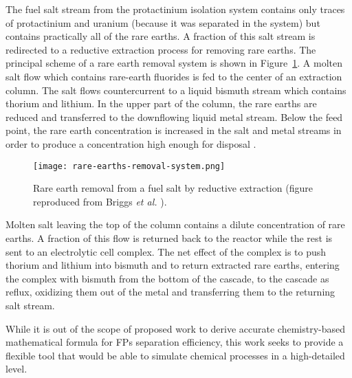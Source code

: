 The fuel salt stream from the protactinium isolation system contains only 
traces of protactinium and uranium (because it was separated in the system) 
but contains practically all of the rare earths. A fraction of this salt 
stream is redirected to a reductive extraction process for removing rare 
earths.  The principal scheme of a rare earth removal system is shown in 
Figure~\ref{fig:rare-earth-removal}. A molten salt flow which contains 
rare-earth fluorides is fed to the center of an extraction column. The salt 
flows countercurrent to a liquid bismuth stream which contains thorium and 
lithium. In the upper part of the column, the rare earths are reduced and 
transferred to the downflowing liquid metal stream. Below the feed point, the 
rare earth concentration is increased in the salt and metal streams in order 
to produce a concentration high enough for disposal 
\cite{briggs_molten-salt_1969}.
\begin{figure}[htbp!]
	\centering
	\texttt{[image: rare-earths-removal-system.png]}
	\caption{Rare earth removal from a fuel salt by reductive extraction 
	(figure reproduced from Briggs \emph{et al.} 
	\cite{briggs_molten-salt_1969}).}
	\label{fig:rare-earth-removal}
\end{figure}

Molten salt leaving the top of the column contains a dilute concentration of 
rare earths. A fraction of this flow is returned back to the reactor while the 
rest is sent to an electrolytic cell complex. The net effect of the complex is 
to push thorium and lithium into bismuth and to return extracted rare earths, 
entering the complex with bismuth from the bottom of the cascade, to the 
cascade as reflux, oxidizing them out of the metal and transferring them to 
the returning salt stream.

While it is out of the scope of proposed work to derive accurate 
chemistry-based mathematical formula for \glspl{FP} separation efficiency, 
this work seeks to provide a flexible tool that would be able to simulate 
chemical processes in a high-detailed level.

